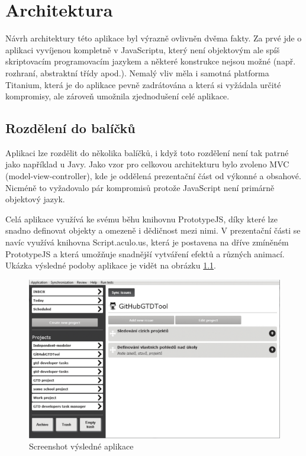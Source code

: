 \chapter{Architektura}

Návrh architektury této aplikace byl výrazně ovlivněn dvěma fakty. Za prvé jde o aplikaci vyvíjenou kompletně v JavaScriptu, který není objektovým ale spíš skriptovacím programovacím jazykem a některé konstrukce nejsou možné (např. rozhraní, abstraktní třídy apod.). Nemalý vliv měla i samotná platforma Titanium, která je do aplikace pevně zadrátována a která si vyžádala určité kompromisy, ale zároveň umožnila zjednodušení celé aplikace.

\section{Rozdělení do balíčků}

Aplikaci lze rozdělit do několika balíčků, i když toto rozdělení není tak patrné jako například u Javy. Jako vzor pro celkovou architekturu bylo zvoleno MVC (model-view-controller), kde je oddělená prezentační část od výkonné a obsahové. Nicméně to vyžadovalo pár kompromisů protože JavaScript není primárně objektový jazyk.

Celá aplikace využívá ke svému běhu knihovnu PrototypeJS\cite{prototypejs}, díky které lze snadno definovat objekty a omezeně i dědičnost mezi nimi. V prezentační části se navíc využívá knihovna Script.aculo.us\cite{scriptaculous}, která je postavena na dříve zmíněném PrototypeJS a která umožňuje snadnější vytváření efektů a různých animací. Ukázka výsledné podoby aplikace je vidět na obrázku \ref{fig:screenshot}.

\begin{figure}[h]
\begin{center}
	\includegraphics[width=14cm]{figures/screenshot}
	\caption{Screenshot výsledné aplikace}
	\label{fig:screenshot}
\end{center}
\end{figure}

